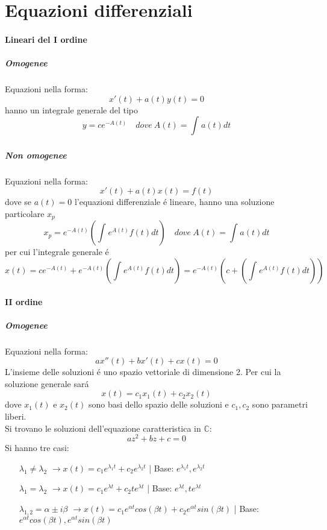 \documentclass[a4paper, titlepage]{report}%
\theoremstyle{definition} %
\theoremstyle{plain}
\theoremstyle{plain}
\theoremstyle{remark}
\theoremstyle{remark}
\theoremstyle{plain}
\theoremstyle{plain}
\theoremstyle{plain}
\theoremstyle{plain}
\theoremstyle{plain}
\begin{document}
\section*{Equazioni differenziali}

\paragraph*{Lineari del I ordine}
     \subparagraph*{Omogenee}
Equazioni nella forma:
     \[
          x'(t) + a(t)y(t) = 0  
     \]
hanno un integrale generale del tipo 
\[
      y = ce^{-A(t)}   \quad dove \ A(t) = \int_{}^{}a(t)dt    
\]

    
     \subparagraph*{Non omogenee}
Equazioni nella forma:
\[
     x'(t) + a(t)x(t) =  f(t) 
\]
dove se $a(t) = 0$ l'equazioni differenziale \'e lineare, hanno una
soluzione particolare $x_p$
\[
       x_p = e^{-A(t)}(\int_{}^{}e^{A(t)}f(t)dt)
       \quad dove \ A(t) = \int_{}^{}a(t)dt
\]
per cui l'integrale generale \'e
\[
    x(t)= ce^{-A(t)} + e^{-A(t)}(\int_{}^{}e^{A(t)}f(t)dt) =
    e^{-A(t)}(c + (\int_{}^{}e^{A(t)}f(t)dt))
\]










\paragraph*{II ordine}
\subparagraph*{Omogenee}
Equazioni nella forma:
\[
     ax''(t) + bx'(t) + cx(t)= 0
\]
L'insieme delle soluzioni \'e uno spazio vettoriale di dimensione
2. Per cui la soluzione generale sar\'a
\[
     x(t)= c_1 x_1(t) + c_2x_2(t)    
\]
dove $x_1(t)$ e $x_2(t)$ sono basi dello spazio delle soluzioni e 
$c_1,c_2$ sono parametri liberi. \\
Si trovano le soluzioni dell'equazione caratteristica in $\mathbb{C}$:
\[
     az^2 + bz +c = 0    
\]
Si hanno tre casi:
\begin{enumerate}
    \item[$\lambda_1 \neq \lambda_2$] 
    $\rightarrow x(t)= c_1e^{\lambda_1 t}+ c_2e^{\lambda_2 t}$ |
    Base: $e^{\lambda_1 t},e^{\lambda_2 t}$
    \item[$\lambda_1 = \lambda_2$] 
    $\rightarrow x(t)= c_1e^{\lambda t}+ c_2te^{\lambda t}$ |
    Base: $e^{\lambda t}, te^{\lambda t}$
    \item[$\lambda_{1,2} = \alpha \pm i\beta$] 
    $\rightarrow x(t)= c_1e^{\alpha t}cos(\beta t)+ c_2
    e^{\alpha t}sin(\beta t)$ |
    Base: $e^{\alpha t}cos(\beta t),e^{\alpha t}sin(\beta t)$ 
\end{enumerate}
\end{document}
